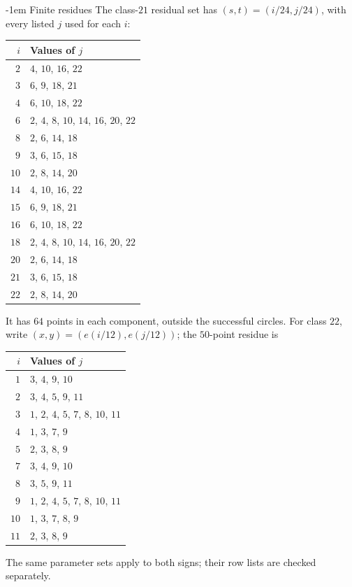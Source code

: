 \documentclass[11pt,a4paper]{article}
\makeatletter
\theoremstyle{plain}
\theoremstyle{definition}
\numberwithin{equation}{section}
\renewcommand\subsection{\@startsection{subsection}{2}{\z@}  {\medskipamount}  {-1em}  {\normalfont\normalsize\bfseries}}
\makeatother
\begin{document}
\subsection{Finite residues}\label{app:finite}
The class-$21$ residual set has $(s,t)=(i/24,j/24)$, with every listed $j$ used for each $i$:
\begin{longtable}{rl}\toprule $i$&Values of $j$\\\midrule\endhead
$2$&$4$, $10$, $16$, $22$\\
$3$&$6$, $9$, $18$, $21$\\
$4$&$6$, $10$, $18$, $22$\\
$6$&$2$, $4$, $8$, $10$, $14$, $16$, $20$, $22$\\
$8$&$2$, $6$, $14$, $18$\\
$9$&$3$, $6$, $15$, $18$\\
$10$&$2$, $8$, $14$, $20$\\
$14$&$4$, $10$, $16$, $22$\\
$15$&$6$, $9$, $18$, $21$\\
$16$&$6$, $10$, $18$, $22$\\
$18$&$2$, $4$, $8$, $10$, $14$, $16$, $20$, $22$\\
$20$&$2$, $6$, $14$, $18$\\
$21$&$3$, $6$, $15$, $18$\\
$22$&$2$, $8$, $14$, $20$\\
\bottomrule\end{longtable}
It has $64$ points in each component, outside the successful circles. For class $22$, write $(x,y)=(e(i/12),e(j/12))$; the $50$-point residue is
\begin{longtable}{rl}\toprule $i$&Values of $j$\\\midrule\endhead
$1$&$3$, $4$, $9$, $10$\\
$2$&$3$, $4$, $5$, $9$, $11$\\
$3$&$1$, $2$, $4$, $5$, $7$, $8$, $10$, $11$\\
$4$&$1$, $3$, $7$, $9$\\
$5$&$2$, $3$, $8$, $9$\\
$7$&$3$, $4$, $9$, $10$\\
$8$&$3$, $5$, $9$, $11$\\
$9$&$1$, $2$, $4$, $5$, $7$, $8$, $10$, $11$\\
$10$&$1$, $3$, $7$, $8$, $9$\\
$11$&$2$, $3$, $8$, $9$\\
\bottomrule\end{longtable}
The same parameter sets apply to both signs; their row lists are checked separately.
\end{document}
